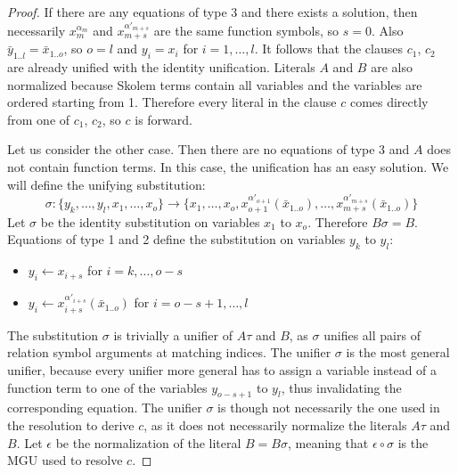 \documentclass[english, shortabstract]{iithesis}
\theoremstyle{definition} \newtheorem{definition}{Definition}[chapter]
\theoremstyle{remark} \newtheorem{remark}[definition]{Observation}
\theoremstyle{plain} \newtheorem{theorem}[definition]{Theorem}
\theoremstyle{plain} \newtheorem{lemma}[definition]{Lemma}
\begin{document}
\begin{proof}
If there are any equations of type 3 and there exists a solution, then
necessarily $x^{\alpha_m}_m$ and $x^{\alpha'_{m+s}}_{m+s}$ are the same function symbols, so $s=0$.
Also $\bar{y}_{1..l}=\bar{x}_{1..o}$, so $o=l$ and $y_i=x_i$ for $i=1,\dots,l$.
It follows that the clauses $c_1$, $c_2$ are already unified with the identity unification.
Literals $A$ and $B$ are also normalized because Skolem terms contain all variables and the variables are ordered starting from 1.
Therefore every literal in the clause $c$ comes directly from one of $c_1$, $c_2$, so $c$ is forward.

Let us consider the other case. Then there are no equations of type 3 and $A$ does not contain function terms. 
In this case, the unification has an easy solution. 
We will define the unifying substitution: $$\sigma : \{y_k,\dots,y_l, x_1, \dots, x_o\} \rightarrow \{x_1,\dots, x_o, x^{\alpha'_{o+1}}_{o+1}(\bar{x}_{1..o}), \dots, x^{\alpha'_{m+s}}_{m+s}(\bar{x}_{1..o})\}$$
Let $\sigma$ be the identity substitution on variables $x_1$ to $x_o$. Therefore $B\sigma=B$.
Equations of type 1 and 2 define the substitution on variables $y_k$ to $y_l$:
\begin{itemize}
    \item $y_i \leftarrow x_{i+s}$ for $i=k,\dots, o-s$
    \item $y_i \leftarrow x^{\alpha'_{i+s}}_{i+s}(\bar{x}_{1..o})$ for $i=o-s+1,\dots, l$
\end{itemize}
The substitution $\sigma$ is trivially a unifier of $A\tau$ and $B$, as
$\sigma$ unifies all pairs of relation symbol arguments at matching indices.
The unifier $\sigma$ is the most general unifier, because every unifier more general
has to assign a variable instead of a function term to one of the variables $y_{o-s+1}$ to $y_l$, 
thus invalidating the corresponding equation. The unifier $\sigma$ is though not necessarily
the one used in the resolution to derive $c$, as it does not necessarily normalize the literals $A\tau$ and $B$.
Let $\epsilon$ be the normalization of the literal $B=B\sigma$, meaning that $\epsilon\circ\sigma$ is the MGU used to resolve $c$.


\end{proof}
\end{document}
